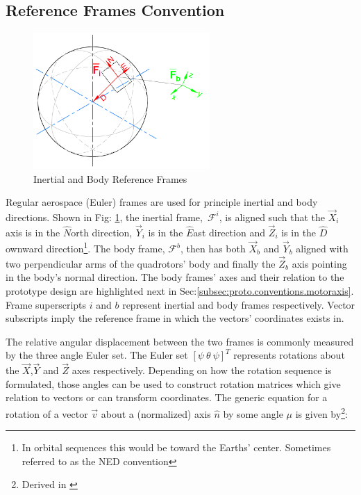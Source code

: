 \subsection{Reference Frames Convention}
\label{subsec:proto.conventions.frames}
\begin{figure}[htbp]
\centering
\includegraphics[width=0.6\textwidth]{figs/reference_frame}
\caption{Inertial and Body Reference Frames}
\label{fig:ref_frame}
\end{figure}
Regular aerospace (Euler) frames are used for principle inertial and body directions. Shown in Fig: \ref{fig:ref_frame}, the inertial frame,~$\mathcal{F}^i$, is aligned such that the $\vec{X}_i$ axis is in the $\hat{N}$orth direction, $\vec{Y}_i$ is in the $\hat{E}$ast direction and $\vec{Z}_i$ is  in the $\hat{D}$ownward direction\footnote{In orbital sequences this would be toward the Earths' center. Sometimes referred to as the NED convention}. The body frame, $\mathcal{F}^b$, then has both $\vec{X}_b$ and $\vec{Y}_b$ aligned with two perpendicular arms of the quadrotors' body and finally the $\vec{Z}_b$ axis pointing in the body's normal direction. The body frames' axes and their relation to the prototype design are highlighted next in Sec:\ref{subsec:proto.conventions.motoraxis}. Frame superscripts $i$ and $b$ represent inertial and body frames respectively. Vector subscripts imply the reference frame in which the vectors' coordinates exists in. 
\par
The relative angular displacement between the two frames is commonly measured by the three angle Euler set. The Euler set $[\psi ~\theta ~\psi]^T$ represents rotations about the $\vec{X}$,$\vec{Y}$ and $\vec{Z}$ axes respectively. Depending on how the rotation sequence is formulated, those angles can be used to construct rotation matrices which give relation to vectors or can transform coordinates. The generic equation for a rotation of a vector $\vec{v}$ about a (normalized) axis $\hat{n}$ by some angle $\mu$ is given by\footnote{Derived in \cite{quaddynamics}}:
